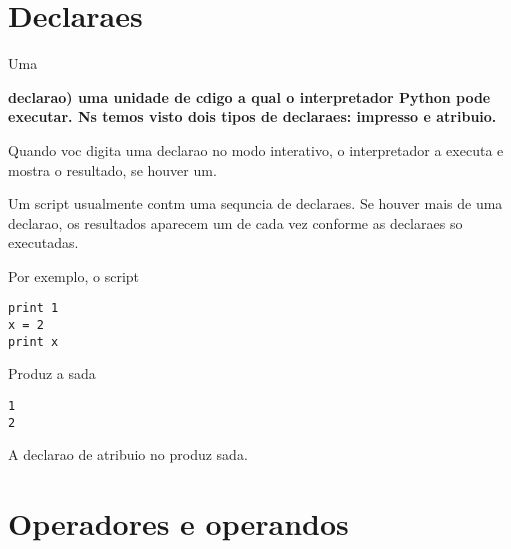 {{{{{{{{{%
\section{Declara  es}

Uma {\bf declara  o)   uma unidade de c digo a qual o interpretador Python 
pode executar. N s temos visto dois tipos de declara  es: impress o 
e atribui  o.


Quando voc  digita uma declara  o no modo interativo, o interpretador 
a executa e mostra o resultado, se houver um.

Um script usualmente cont m uma sequ ncia de declara  es. Se houver 
mais de uma declara  o, os resultados aparecem um de cada vez 
conforme as declara  es s o executadas.

Por exemplo, o script

\beforeverb
\begin{verbatim}
print 1
x = 2
print x
\end{verbatim}
\afterverb
%
Produz a sa da

\beforeverb
\begin{verbatim}
1
2
\end{verbatim}
\afterverb
%
A declara  o de atribui  o n o produz sa da.

\section{Operadores e operandos}

}}}}}}}}}}
